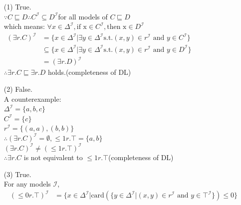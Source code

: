 \documentclass[12pt]{article}
\begin{document}
    \begin{enumerate}
        \item[(1)]
        True. \\
        $\because C \sqsubseteq D \therefore C^{\mathcal{I}} \subseteq D^{\mathcal{I}}$for all models of $C \sqsubseteq D$ \\
        which means: $\forall x \in \Delta^{\mathcal{I}}, \text{if x} \in  C^{\mathcal{I}}, \text{then x}  \in  D^{\mathcal{I}}$ \\
        $
        \begin{aligned}
        (\exists r.C)^{\mathcal{I}} &= \{ x \in \Delta^{\mathcal{I}} | \exists y \in  \Delta^{\mathcal{I}} \mathrm{ s.t. } (x, y) \in r^{\mathcal{I}} \text{ and } y \in C^{\mathcal{I}} \} \\
        &\subseteq \{ x \in \Delta^{\mathcal{I}} | \exists y \in  \Delta^{\mathcal{I}} \mathrm{ s.t. } (x, y) \in r^{\mathcal{I}} \text{ and } y \in D^{\mathcal{I}} \} \\
        &= (\exists r.D)^{\mathcal{I}}
        \end{aligned}
        $ \\
        $\therefore \exists r.C \sqsubseteq \exists r.D$ holds.(completeness of DL)
        \item[(2)]
        False. \\
        A counterexample: \\
        $\Delta^{\mathcal{I}} = \{a, b, c\}$ \\
        $C^{\mathcal{I}} = \{c\}$ \\
        $r^{\mathcal{I}} = \{(a, a), (b, b)\}$ \\
        $\therefore (\exists r.C)^{\mathcal{I}} = \emptyset,  \le 1r.\top = \{ a, b \}$ \\
        $(\exists r.C)^{\mathcal{I}} \neq (\le 1r.\top)^{\mathcal{I}}$ \\
        $\therefore \exists r.C$ is not equivalent to $\le 1r.\top$(completeness of DL)
        \item[(3)]
        True. \\
        For any models $\mathcal{I}$, \\
        \begin{equation}
            \begin{aligned}
                (\le 0r.\top)^{\mathcal{I}} &= \{ x \in \Delta^{\mathcal{I}} | \text{card}\left( \{ y \in \Delta^{\mathcal{I}} | (x, y) \in r^{\mathcal{I}} \text{ and } y \in \top^{\mathcal{I}} \} \right) \le 0  \} \\

\end{aligned}
\end{equation}
\end{enumerate}
\end{document}
